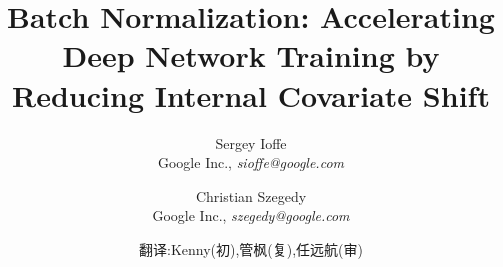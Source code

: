 \documentclass[twocolumn]{article}
\begin{document}
\newcommand{\jac}[2]{\frac{\partial #1}{\partial #2}}
\newcommand{\xhat}{\widehat{x}}
\newcommand{\yhat}{\widehat{y}}
\newcommand{\zhat}{\widehat{z}}
\newcommand{\vxhat}{\widehat\mathrm{x}}
\newcommand{\vzhat}{\widehat\mathrm{z}}
\newcommand{\setX}{\mathcal{X}}
\newcommand{\setB}{\mathcal{B}}
\newcommand{\E}{\text{E}}
\newcommand{\Var}{\text{Var}}
\newcommand{\Cov}{\text{Cov}}
\newcommand{\Fhat}{\widehat{F}}
\newcommand{\Thetahat}{\widehat{\Theta}}
\newcommand{\Norm}{\text{Norm}}
\newcommand{\BatchNorm}{\text{BN}}
\newcommand{\kk}{{(k)}}
\newcommand{\vx}{\mathrm{x}}
\newcommand{\vy}{\mathrm{y}}
\newcommand{\vz}{\mathrm{z}}
\newcommand{\vb}{\mathrm{b}}
\newcommand{\vu}{\mathrm{u}}
\newcommand{\comt}{// }
\renewcommand{\algorithmiccomment}[1]{\comt #1}
\newcommand{\BN}[2]{\text{BN}_{#2}(#1)}
\renewcommand{\algorithmicrequire}{\textbf{Input:}}
\renewcommand{\algorithmicensure}{\textbf{Output:}}
\newcommand{\mils}{\cdot 10^6}
\newcommand{\netw}[1]{{\sl #1}}
\newcommand{\norig}{\text{\sl N}}
\newcommand{\ntrain}{\norig_\mathrm{BN}^\mathrm{tr}}
\newcommand{\ninf}{\norig_\mathrm{BN}^\mathrm{inf}}
\renewcommand{\cite}[1]{\citep{#1}}


\title{Batch Normalization: Accelerating Deep Network Training by Reducing Internal Covariate Shift}

\author{Sergey Ioffe \\Google Inc., {\sl sioffe@google.com} \and
Christian Szegedy \\Google Inc., {\sl szegedy@google.com} \and 翻译:Kenny(初),管枫(复),任远航(审)
}

\date{}

\maketitle
\end{document}
